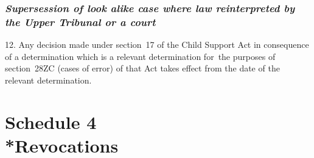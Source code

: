 \documentclass[12pt,a4paper]{article}
\begin{document}

\section*{\itshape\sloppy{} Supersession of look alike case where law reinterpreted by the Upper Tribunal or a court}

12.  Any decision made under section~17 of the Child Support Act in consequence of a determination which is a relevant determination for~the purposes of section~28ZC (cases of error) of that Act takes effect from the date of the relevant determination.

\part[Schedule 4 --- Revocations]{Schedule 4\\*Revocations}

\renewcommand\parthead{--- Schedule 4}
\end{document}
